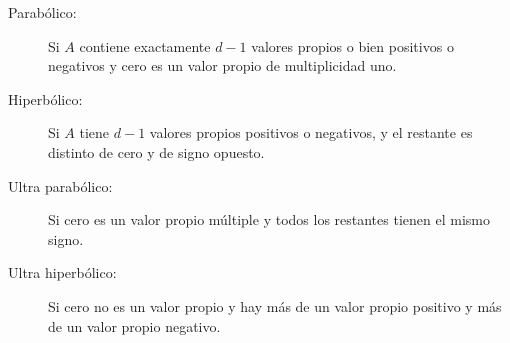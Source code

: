 \begin{definition}
\begin{description}
        \item[Parabólico:]

            Si $A$ contiene exactamente $d-1$ valores propios o bien
            positivos o negativos y cero es un valor propio de
            multiplicidad uno.

        \item[Hiperbólico:]

            Si $A$ tiene $d-1$ valores propios positivos o negativos,
            y el restante es distinto de cero y de signo opuesto.

        \item[Ultra parabólico:]

            Si cero es un valor propio múltiple y todos los restantes
            tienen el mismo signo.

        \item[Ultra hiperbólico:]

            Si cero no es un valor propio y hay más de un valor
            propio positivo y más de un valor propio negativo.
    \end{description}
\end{definition}

